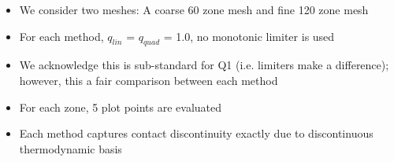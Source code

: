 \documentclass[8pt,xcolor=svgnames]{beamer}
\begin{document}
\begin{frame}
\begin{columns}
\begin{column}{0.4\textwidth}
\begin{figure}[h!]
    \end{figure}
  \end{column}
 \end{columns}
 \begin{itemize}
  \item We consider two meshes: A coarse 60 zone mesh and fine 120 zone mesh
  \item For each method, $q_{lin}$ = $q_{quad}$ = 1.0, no monotonic limiter is used
  \item We acknowledge this is sub-standard for Q1 (i.e. limiters make a difference); however, this a fair comparison between each method
  \item For each zone, 5 plot points are evaluated
  \item Each method captures contact discontinuity exactly due to discontinuous thermodynamic basis
 \end{itemize}
\end{frame}
\end{document}
